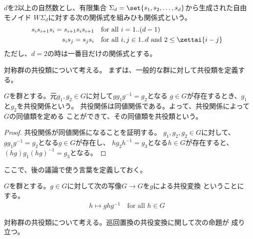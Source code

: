 	\begin{definition}[組みひも関係式]\label{def:組みひも関係式} %
		$d$を$2$以上の自然数とし、有限集合
		$\Sigma_d=\set{s_1,s_2,\dots,s_d}$から生成された自由モノイド
		$W\Sigma_d$に対する次の関係式を組みひも関係式という。
		\begin{equation*}\begin{split} %
			s_is_{i+1}s_i = s_{i+1}s_{i}s_{i+1} &\quad\text{for all }i=1..(d-1) \\
			s_is_j = s_js_i
			&\quad\text{for all }i,j\in1..d\text{ and }2\le\zettai{i-j} \\
		\end{split}\end{equation*} %
		ただし、$d=2$の時は一番目だけの関係式とする。
	\end{definition} %

	対称群の共役類について考える。
	まずは、一般的な群に対して共役類を定義する。

	\begin{definition}[共役（conjugate）]\label{def:共役} %
		$G$を群とする。元$g_1,g_2\in G$に対して$gg_1g^{-1}=g_2$となる
		$g\in G$が存在するとき、$g_1$と$g_2$を共役関係という。
		共役関係は同値関係である。よって、共役関係によって$G$の同値類を定める
		ことができて、その同値類を共役類という。
	\end{definition} %
	\begin{proof} %
		共役関係が同値関係になることを証明する。
		$g_1,g_2,g_2\in G$に対して、$gg_1g^{-1}=g_2$となる$g\in G$が存在し、
		$hg_2h^{-1}=g_3$となる$h\in G$が存在すると、
		$(hg)g_1(hg)^{-1}=g_3$となる。
	\end{proof} %

	ここで、後の議論で使う言葉を定義しておく。

	\begin{definition}[共役変換]\label{def:共役変換} %
		$G$を群とする。$g\in G$に対して次の写像$G\to G$を$g$による共役変換
		ということにする。
		\begin{equation*}\begin{split} %
			h\mapsto ghg^{-1} \quad\text{for all }h\in G
		\end{split}\end{equation*} %
	\end{definition} %

	対称群の共役類について考える。巡回置換の共役変換に関して次の命題が
	成り立つ。

